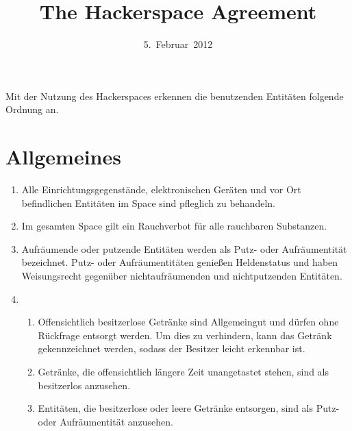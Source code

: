 \documentclass[12pt,a4paper]{scrartcl}
\title{The Hackerspace Agreement}
\date{5.~Februar~2012}
\begin{document}
\maketitle

\noindent Mit der Nutzung des Hackerspaces erkennen die benutzenden Entitäten
folgende Ordnung an.

\enlargethispage{1em}
\section{Allgemeines}
\begin{enumerate}
  \item Alle Einrichtungsgegenstände, elektronischen Geräten und vor Ort
    befindlichen Entitäten im Space sind pfleglich zu behandeln.

  \item Im gesamten Space gilt ein Rauchverbot für alle rauchbaren Substanzen.

  \item Aufräumende oder putzende Entitäten werden als Putz- oder Aufräumentität
    bezeichnet. Putz- oder Aufräumentitäten genießen Heldenstatus und haben
    Weisungsrecht gegenüber nichtaufräumenden und nichtputzenden Entitäten.

  \item\begin{enumerate}
    \item Offensichtlich besitzerlose Getränke sind Allgemeingut und dürfen ohne
      Rückfrage entsorgt werden. Um dies zu verhindern, kann das Getränk
      gekennzeichnet werden, sodass der Besitzer leicht erkennbar ist.
    \item Getränke, die offensichtlich längere Zeit unangetastet stehen, sind
      als besitzerlos anzusehen.
    \item Entitäten, die besitzerlose oder leere Getränke entsorgen, sind als
      Putz- oder Aufräumentität anzusehen.
  \end{enumerate}


\end{enumerate}
\end{document}
